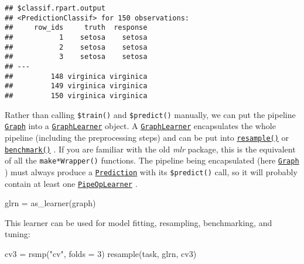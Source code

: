 \documentclass[
]{scrbook}
\newenvironment{Shaded}{\begin{snugshade}}{\end{snugshade}}
\newcommand{\AttributeTok}[1]{\textcolor[rgb]{0.77,0.63,0.00}{#1}}
\newcommand{\DecValTok}[1]{\textcolor[rgb]{0.00,0.00,0.81}{#1}}
\newcommand{\FunctionTok}[1]{\textcolor[rgb]{0.00,0.00,0.00}{#1}}
\newcommand{\NormalTok}[1]{#1}
\newcommand{\OtherTok}[1]{\textcolor[rgb]{0.56,0.35,0.01}{#1}}
\newcommand{\SpecialCharTok}[1]{\textcolor[rgb]{0.00,0.00,0.00}{#1}}
\newcommand{\StringTok}[1]{\textcolor[rgb]{0.31,0.60,0.02}{#1}}
\renewenvironment{Shaded} {\begin{snugshade}\small} {\end{snugshade}}
\begin{document}
\begin{Shaded}
\end{Shaded}

\begin{verbatim}
## $classif.rpart.output
## <PredictionClassif> for 150 observations:
##     row_ids     truth  response
##           1    setosa    setosa
##           2    setosa    setosa
##           3    setosa    setosa
## ---                            
##         148 virginica virginica
##         149 virginica virginica
##         150 virginica virginica
\end{verbatim}

Rather than calling \texttt{\$train()} and \texttt{\$predict()} manually, we can put the pipeline \href{https://mlr3pipelines.mlr-org.com/reference/Graph.html}{\texttt{Graph}} into a \href{https://mlr3pipelines.mlr-org.com/reference/mlr_learners_graph.html}{\texttt{GraphLearner}} object.
A \href{https://mlr3pipelines.mlr-org.com/reference/mlr_learners_graph.html}{\texttt{GraphLearner}} encapsulates the whole pipeline (including the preprocessing steps) and can be put into \href{https://mlr3.mlr-org.com/reference/resample.html}{\texttt{resample()}} or \href{https://mlr3.mlr-org.com/reference/benchmark.html}{\texttt{benchmark()}} .
If you are familiar with the old \emph{mlr} package, this is the equivalent of all the \texttt{make*Wrapper()} functions.
The pipeline being encapsulated (here \href{https://mlr3pipelines.mlr-org.com/reference/Graph.html}{\texttt{Graph}} ) must always produce a \href{https://mlr3.mlr-org.com/reference/Prediction.html}{\texttt{Prediction}} with its \texttt{\$predict()} call, so it will probably contain at least one \href{https://mlr3pipelines.mlr-org.com/reference/mlr_pipeops_learner.html}{\texttt{PipeOpLearner}} .

\begin{Shaded}
\begin{Highlighting}[]
\NormalTok{glrn }\OtherTok{=} \FunctionTok{as\_learner}\NormalTok{(graph)}
\end{Highlighting}
\end{Shaded}

This learner can be used for model fitting, resampling, benchmarking, and tuning:

\begin{Shaded}
\begin{Highlighting}[]
\NormalTok{cv3 }\OtherTok{=} \FunctionTok{rsmp}\NormalTok{(}\StringTok{"cv"}\NormalTok{, }\AttributeTok{folds =} \DecValTok{3}\NormalTok{)}
\FunctionTok{resample}\NormalTok{(task, glrn, cv3)}
\end{Highlighting}
\end{Shaded}
\end{document}
